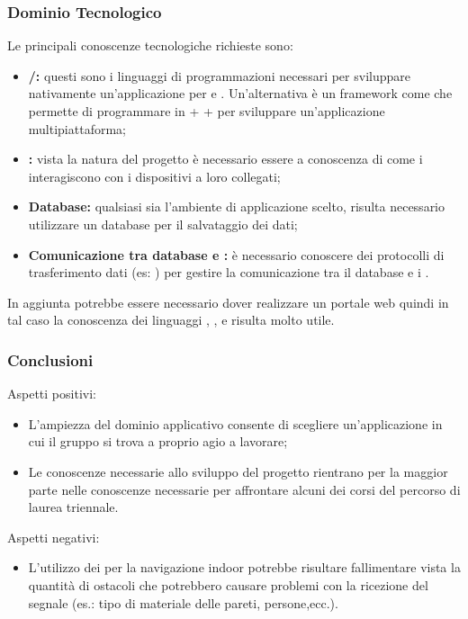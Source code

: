 \subsubsection{Dominio Tecnologico}
Le principali conoscenze tecnologiche richieste sono:

\begin{itemize}
	\item \textbf{/:} questi sono i linguaggi di programmazioni necessari per sviluppare nativamente un'applicazione per  e . Un'alternativa è un framework come  che 
	permette di programmare in  +  +  per sviluppare un'applicazione multipiattaforma;
	\item \textbf{:} vista la natura del progetto è necessario essere a conoscenza di come i  interagiscono con i dispositivi a loro collegati;
	\item \textbf{Database:} qualsiasi sia l'ambiente di applicazione scelto, risulta necessario utilizzare un database per il salvataggio dei dati;
	\item \textbf{Comunicazione tra database e :} è necessario conoscere dei protocolli di trasferimento dati (es: ) per gestire la comunicazione tra il database e i .
\end{itemize}

In aggiunta potrebbe essere necessario dover realizzare un portale web quindi in tal caso la conoscenza dei linguaggi , ,  e  risulta molto utile.


\subsubsection{Conclusioni}

Aspetti positivi:

\begin{itemize}
	\item L'ampiezza del dominio applicativo consente di scegliere un'applicazione in cui il gruppo si trova a proprio agio a lavorare;
	\item Le conoscenze necessarie allo sviluppo del progetto rientrano per la maggior parte nelle conoscenze necessarie per affrontare alcuni dei corsi
	del percorso di laurea triennale.
\end{itemize}

Aspetti negativi:

\begin{itemize}
	\item L'utilizzo dei  per la navigazione indoor potrebbe risultare fallimentare vista la quantità di ostacoli che potrebbero causare problemi con 
	la ricezione del segnale (es.: tipo di materiale delle pareti, persone,ecc.).
\end{itemize}